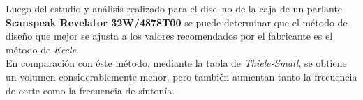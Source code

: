
\normalfont

Luego del estudio y análisis realizado para el dise~no de la caja de un parlante \textbf{Scanspeak Revelator 32W/4878T00} se puede determinar que el método de diseño que mejor se ajusta a los valores recomendados por el fabricante es el método de \textit{Keele}. \\

En comparación con éste método, mediante la tabla de \textit{Thiele-Small}, se obtiene un volumen considerablemente menor, pero también aumentan tanto la frecuencia de corte como la frecuencia de sintonía.
